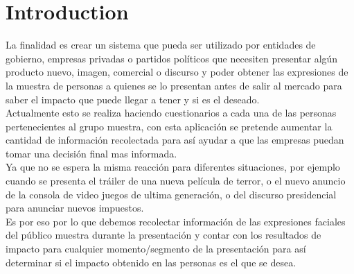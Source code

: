 
\section{Introduction}

La finalidad es crear un sistema que pueda ser utilizado por entidades de
gobierno, empresas privadas o partidos políticos que necesiten presentar algún
producto nuevo, imagen, comercial o discurso y poder obtener las expresiones de
la muestra de personas a quienes se lo presentan antes de salir al mercado para
saber el impacto que puede llegar a tener y si es el deseado. \\Actualmente
esto se realiza haciendo cuestionarios a cada una de las personas
pertenecientes al grupo muestra, con esta aplicación se pretende aumentar la
cantidad de información recolectada para así ayudar a que las empresas puedan
tomar una decisión final mas informada. \\Ya que no se espera la misma reacción
para diferentes situaciones, por ejemplo cuando se presenta el tráiler de una
nueva película de terror, o el nuevo anuncio de la consola de video juegos de
ultima generación, o del discurso presidencial para anunciar nuevos impuestos.
\\Es por eso por lo que debemos recolectar información de las expresiones
faciales del público muestra durante la presentación y contar con los
resultados de impacto para cualquier momento/segmento de la presentación para
así determinar si el impacto obtenido en las personas es el que se desea.